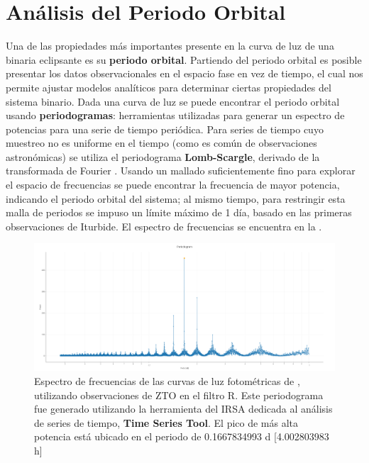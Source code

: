 \section{Análisis del Periodo Orbital} \label{metodologia:analisisperiodo}

Una de las propiedades más importantes presente en la curva de luz de una
binaria eclipsante es su \textbf{periodo orbital}. Partiendo del periodo orbital
es posible presentar los datos observacionales en el espacio fase en vez de
tiempo, el cual nos permite ajustar modelos analíticos para determinar ciertas
propiedades del sistema binario. Dada una curva de luz se puede encontrar el
periodo orbital usando \textbf{periodogramas}: herramientas utilizadas para
generar un espectro de potencias para una serie de tiempo periódica. Para series
de tiempo cuyo muestreo no es uniforme en el tiempo (como es común de
observaciones astronómicas) se utiliza el periodograma \textbf{Lomb-Scargle},
derivado de la transformada de Fourier .
Usando un mallado suficientemente fino para explorar el espacio de frecuencias
se puede encontrar la frecuencia de mayor potencia, indicando el periodo orbital
del sistema; al mismo tiempo, para restringir esta malla de periodos se impuso
un límite máximo de 1 día, basado en las primeras observaciones de Iturbide. El
espectro de frecuencias se encuentra en la . 

\begin{figure}[!h]
	\centering
	\includegraphics[scale=0.23]{Metodologia/Secciones/AnalisisPeriodo/Figures/IRSA Periodogram.png}
	
	\caption{Espectro de frecuencias de las curvas de luz fotométricas de
	\atoObjIdNoSpace, utilizando observaciones de ZTO en el filtro R. Este
	periodograma fue generado utilizando la herramienta del IRSA dedicada al
	análisis de series de tiempo, \textbf{Time Series Tool}. El pico de más alta
	potencia está ubicado en el periodo de 0.1667834993 d [4.002803983 h]} 
	\label{periodogramaLSFrecs}
\end{figure}

